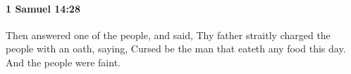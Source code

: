 
		\paragraph{1 Samuel 14:28} %
			\label{1SAMUEL-14-28}

			Then answered one of the people, and said, Thy father straitly charged the people with an oath, saying, Cursed be the man that eateth any food this day. And the people were faint.


